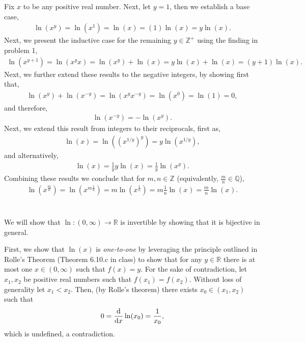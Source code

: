 \documentclass[12 pt,letterpaper]{article}
\begin{document}
\section{}
Fix \(x\) to be any positive real number.
Next, let \(y=1\), then we establish a base case,
\begin{align*}
    \ln(x^y)
    = \ln(x^1)
    = \ln(x)
    = (1)\ln(x)
    = y\ln(x).
\end{align*}
Next, we present the inductive case for the remaining \(y\in\mathbb{Z}^+\)
using the finding in problem 1,
\begin{align*}
    \ln(x^{y+1})
    = \ln(x^y x)
    = \ln(x^y) + \ln(x)
    = y\ln(x) + \ln(x)
    = (y+1)\ln(x).
\end{align*}
Next, we further extend these results to the negative integers, by showing first that,
\begin{align*}
    \ln(x^{y}) + \ln(x^{-y})
    = \ln(x^{y} x^{-y})
    = \ln(x^0)
    = \ln(1)
    = 0,
\end{align*}
and therefore,
\begin{align*}
    \ln(x^{-y})
    = -\ln(x^{y}).
\end{align*}
Next, we extend this result from integers to their reciprocals, first as,
\begin{align*}
    \ln(x)
    = \ln((x^{1/y})^y)
    = y \ln(x^{1/y}),
\end{align*}
and alternatively,
\begin{align*}
    \ln(x)
    = \frac{1}{y} y\ln(x^{})
    = \frac{1}{y} \ln(x^{y}).
\end{align*}
Combining these results we conclude that for \(m,n\in\mathbb{Z}\)
(equivalently, \(\frac{m}{n}\in\mathbb{Q}\)),
\begin{align*}
    \ln(x^{\frac{m}{n}})
    = \ln(x^{m\frac{1}{n}})
    = m\ln(x^{\frac{1}{n}})
    = m\frac{1}{n}\ln(x^{})
    = \frac{m}{n}\ln(x^{}).
\end{align*}

\clearpage

\section{}
We will show that \(\ln:(0,\infty)\rightarrow\mathbb{R}\) is invertible
by showing that it is bijective in general.

First, we show that \(\ln(x)\) is \emph{one-to-one} by leveraging the principle outlined
in Rolle's Theorem (Theorem 6.10.c in class) to show that for any \(y\in\mathbb{R}\)
there is at most one \(x\in(0,\infty)\) such that \(f(x)=y\).
For the sake of contradiction, let \(x_1,x_2\) be positive real numbers such 
that \(f(x_1) = f(x_2)\). Without loss of generality let \(x_1<x_2\).
%
Then, (by Rolle's theorem) there exists \(x_0\in(x_1,x_2)\)
such that \[0 = \dv{x}\ln(x_0) = \frac{1}{x_0},\]
which is undefined, a contradiction. \\
\end{document}
